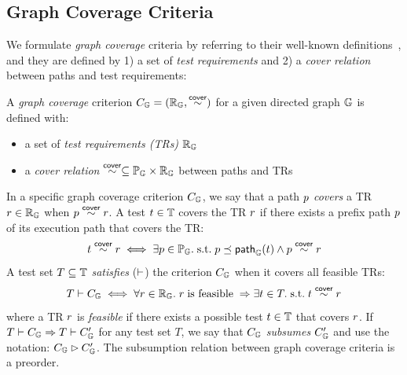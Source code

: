 

\subsection{Graph Coverage Criteria}\label{sec:cov}

We formulate \textit{graph coverage} criteria by referring to their well-known
definitions~\cite{cov-def}, and they are defined by 1) a set of \textit{test
requirements} and 2) a \textit{cover relation} between paths and test
requirements:


\begin{definition}\label{def:graph-cov}
  A \textit{graph coverage} criterion $C_{\mathbb{G}} = (\mathbb{R}_{\mathbb{G}}, \overset{\textsf{cover}}{\sim})$
  for a given directed graph $\mathbb{G}$ is defined with:
  \begin{itemize}
    \item a set of \textit{test requirements (TRs)} $\mathbb{R}_{\mathbb{G}}$
    \item a \textit{cover relation} $\overset{\textsf{cover}}{\sim} \subseteq \mathbb{P}_{\mathbb{G}} \times
      \mathbb{R}_{\mathbb{G}}$ between paths and TRs
  \end{itemize}
\end{definition}


In a specific graph coverage criterion $C_{\mathbb{G}}$, we say that a path $p$
\textit{covers} a TR $r \in \mathbb{R}_{\mathbb{G}}$ when $p \overset{\textsf{cover}}{\sim}
r$.
A test $t \in \mathbb{T}$ covers the TR $r$ if there exists
a prefix path $p$ of its execution path that covers the TR:
%
\begin{equation}\label{equ:test-cover}
  t \overset{\textsf{cover}}{\sim} r
  \iff
  \exists p \in \mathbb{P}_{\mathbb{G}}. {\; \text{s.t.} \; }
  p \preceq \textsf{path}_{\mathbb{G}}(t) \wedge
  p \overset{\textsf{cover}}{\sim} r
\end{equation}
%
A test set $T \subseteq \mathbb{T}$ \textit{satisfies} ($\vdash$) the criterion
$C_{\mathbb{G}}$ when it covers all feasible TRs:
\begin{equation}\label{equ:sat}
  T \vdash C_{\mathbb{G}}
  \iff
  \forall r \in \mathbb{R}_{\mathbb{G}}. \;
  r \; \text{is feasible} \; \Rightarrow
  \exists t \in T. {\; \text{s.t.} \; } t \overset{\textsf{cover}}{\sim} r
\end{equation}
where a TR $r$ is \textit{feasible} if there exists a possible test $t \in
\mathbb{T}$ that covers $r$.
%
If $T \vdash C_{\mathbb{G}} \Rightarrow T \vdash C_{\mathbb{G}}'$ for any test set $T$,
we say that $C_{\mathbb{G}}$ \textit{subsumes} $C_{\mathbb{G}}'$ and use the
notation: $C_{\mathbb{G}} \rhd C_{\mathbb{G}}'$.
%
The subsumption relation between graph coverage criteria is a preorder.

